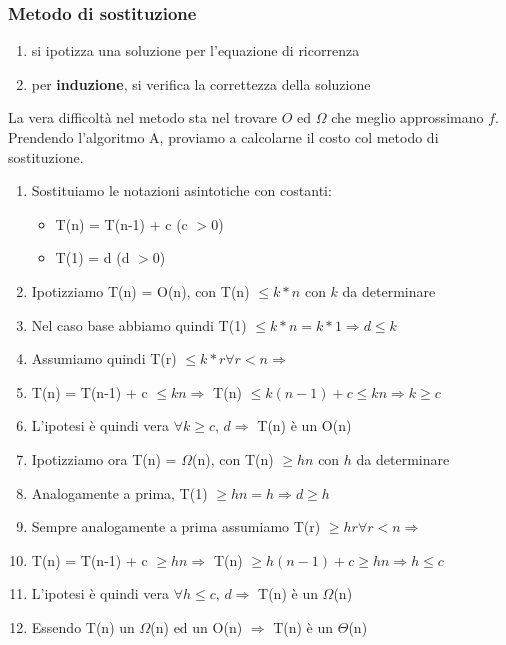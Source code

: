 \documentclass{report}
\newcommand{\T}[1]{$\Theta$(#1)}
\begin{document}
        \subsubsection{Metodo di sostituzione}
        \begin{enumerate}
            \item si ipotizza una soluzione per l'equazione di ricorrenza
            \item per \textbf{induzione}, si verifica la correttezza della soluzione
        \end{enumerate}
            La vera difficoltà nel metodo sta nel trovare $O$ ed $\Omega$ che meglio
            approssimano $f$. \\
            Prendendo l'algoritmo A, proviamo a calcolarne il costo col metodo di sostituzione. \\
        \begin{enumerate}
            \item Sostituiamo le notazioni asintotiche con costanti:
            \begin{itemize}
                \item T(n) = T(n-1) + c (c $> 0$)
                \item T(1) = d (d $> 0$)
            \end{itemize}
            \item Ipotizziamo T(n) = O(n), con T(n) $\leq k*n$ con $k$ da determinare
            \item Nel caso base abbiamo quindi T(1) $\leq k*n = k * 1 \Longrightarrow d \leq k$
            \item Assumiamo quindi T(r) $\leq k*r \forall r < n \Longrightarrow$
            \item T(n) = T(n-1) + c $\leq kn \Longrightarrow$ T(n) $\leq k(n-1) + c \leq kn \Longrightarrow k \geq c$
            \item L'ipotesi è quindi vera $\forall k \geq c, \, d \Longrightarrow$ T(n) è un O(n)
            \item Ipotizziamo ora T(n) = $\Omega$(n), con T(n) $\geq hn$ con $h$ da determinare
            \item Analogamente a prima, T(1) $\geq hn = h \Longrightarrow d \geq h$
            \item Sempre analogamente a prima assumiamo T(r) $\geq hr \forall r < n \Longrightarrow$
            \item T(n) = T(n-1) + c $\geq hn \Longrightarrow$ T(n) $\geq h(n-1) + c \geq hn \Longrightarrow h \leq c$
            \item L'ipotesi è quindi vera $\forall h \leq c, \, d \Longrightarrow$ T(n) è un $\Omega$(n)
            \item Essendo T(n) un $\Omega$(n) ed un O(n) $\Longrightarrow$ T(n) è un \T{n}
        \end{enumerate}
\end{document}
